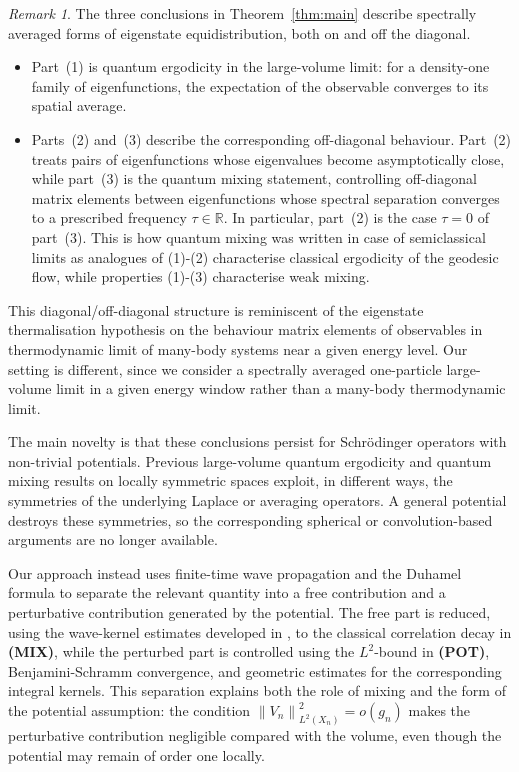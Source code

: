 \documentclass[11pt,twoside,reqno]{amsart}
\newcommand{\1}{\mathrm{\mathbf{1}}}
\newcommand{\norm}[1]{\left\lVert#1\right\rVert}
\numberwithin{equation}{section}
\theoremstyle{plain}
\theoremstyle{definition}
\theoremstyle{remark}
\newtheorem{remark}[thm]{Remark}
\begin{document}
\begin{remark}
The three conclusions in Theorem~\ref{thm:main} describe spectrally averaged forms of eigenstate equidistribution, both on and off the diagonal. 
\begin{itemize}
    \item  Part~(1) is quantum ergodicity in the large-volume limit: for a density-one family of eigenfunctions, the expectation of the observable converges to its spatial average. \item 
    Parts~(2) and~(3) describe the corresponding off-diagonal behaviour. Part~(2) treats pairs of eigenfunctions whose eigenvalues become asymptotically close, while part~(3) is the quantum mixing statement, controlling off-diagonal matrix elements between eigenfunctions whose spectral separation converges to a prescribed frequency $\tau\in\mathbb R$. In particular, part~(2) is the case $\tau=0$ of part~(3). This is how quantum mixing was written in case of semiclassical limits \cite{Zel96a} as analogues of (1)-(2) characterise classical ergodicity of the geodesic flow, while properties (1)-(3) characterise weak mixing.
\end{itemize}

This diagonal/off-diagonal structure is reminiscent of the eigenstate thermalisation hypothesis \cite{deutschEigenstateThermalizationHypothesis2018} on the behaviour matrix elements of observables in thermodynamic limit of many-body systems near a given energy level. Our setting is different, since we consider a spectrally averaged one-particle large-volume limit in a given energy window rather than a many-body thermodynamic limit.
\end{remark}

The main novelty is that these conclusions persist for Schr\"odinger operators with non-trivial potentials. Previous large-volume quantum ergodicity and quantum mixing results on locally symmetric spaces \cite{lemassonQuantumErgodicityBenjaminiSchramm2017,abertEigenfunctionsRandomWaves2018,brumley2026quantumergodicitybenjaminischrammlimit,brumley2020quantumergodicitycompactquotients,peterson2023quantumergodicitybruhattitsbuilding} exploit, in different ways, the symmetries of the underlying Laplace or averaging operators. A general potential destroys these symmetries, so the corresponding spherical or convolution-based arguments are no longer available. 

Our approach instead uses finite-time wave propagation and the Duhamel formula to separate the relevant quantity into a free contribution and a perturbative contribution generated by the potential. The free part is reduced, using the wave-kernel estimates developed in \cite{Hippi}, to the classical correlation decay in \textbf{(MIX)}, while the perturbed part is controlled using the $L^2$-bound in \textbf{(POT)}, Benjamini-Schramm convergence, and geometric estimates for the corresponding integral kernels. This separation explains both the role of mixing and the form of the potential assumption: the condition $\norm{V_n}_{L^2(X_n)}^2=o(g_n)$ makes the perturbative contribution negligible compared with the volume, even though the potential may remain of order one locally.
\end{document}
